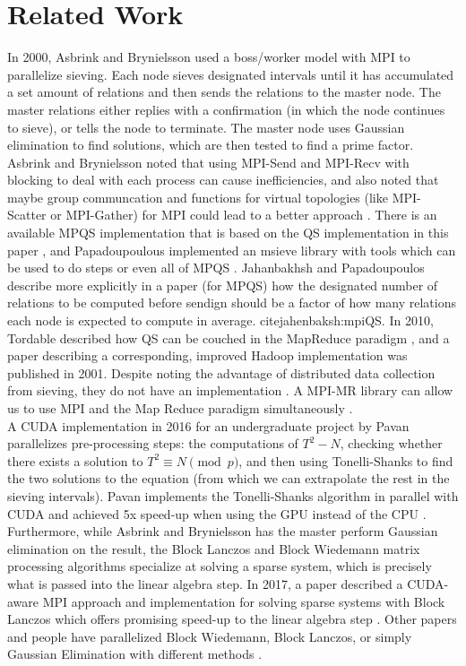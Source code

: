 \documentclass[11pt,twocolumn]{article}
\begin{document}
\section {Related Work}\label{rel}
In 2000, Asbrink and Brynielsson used a boss/worker model with MPI to parallelize sieving. Each node sieves designated intervals until it has accumulated a set amount of relations and then sends the relations to the master node. The master relations either replies with a confirmation (in which the node continues to sieve), or tells the node to terminate. The master node uses Gaussian elimination to find solutions, which are then tested to find a prime factor. Asbrink and Brynielsson noted that using MPI-Send and MPI-Recv  with blocking to deal with each process can cause inefficiencies, and also noted that maybe group communcation and functions for virtual topologies (like MPI-Scatter or MPI-Gather) for MPI could lead to a better approach \cite{asbrink:parallelqs}. There is an available MPQS implementation that is based on the QS implementation in this paper \cite{bytopia:help}, and Papadoupoulous implemented an msieve library with tools which can be used to do steps or even all of MPQS \cite{papadopoulos:msieve}. Jahanbakhsh and Papadoupoulos describe more explicitly in a paper (for MPQS) how the designated number of relations to be computed before sendign should be a factor of how many relations each node is expected to compute in average. cite{jahenbaksh:mpiQS}. In 2010, Tordable described how QS can be couched in the MapReduce paradigm \cite{tordable:intmapreduce}, and a paper describing a corresponding, improved Hadoop implementation was published in 2001. Despite noting the advantage of distributed data collection from sieving, they do not have an implementation \cite{nguyen:hadoop}. A MPI-MR library can allow us to use MPI and the Map Reduce paradigm simultaneously \cite{plimpton:mpimr}. \\
\indent A CUDA implementation in 2016 for an undergraduate project by Pavan parallelizes pre-processing steps: the computations of $T^2 - N$, checking whether there exists a solution to $T^2 \equiv N \pmod{p}$, and then using Tonelli-Shanks to find the two solutions to the equation (from which we can extrapolate the rest in the sieving intervals). Pavan implements the Tonelli-Shanks algorithm in parallel with CUDA and achieved 5x speed-up when using the GPU instead of the CPU \cite{pavan:parallelgpu}.  Furthermore, while Asbrink and Brynielsson has the master perform Gaussian elimination on the result, the Block Lanczos and Block Wiedemann matrix processing algorithms specialize at solving a sparse system, which is precisely what is passed into the linear algebra step. In 2017, a paper described a CUDA-aware MPI approach and implementation for solving sparse systems with Block Lanczos which offers promising speed-up to the linear algebra step \cite{verma:cudampilanczos}. Other papers and people have parallelized Block Wiedemann, Block Lanczos, or simply Gaussian Elimination with different methods \cite{flesch:lanczos} \cite{cohen:gaussian} \cite{wozniak:lanczos}.
\end{document}
